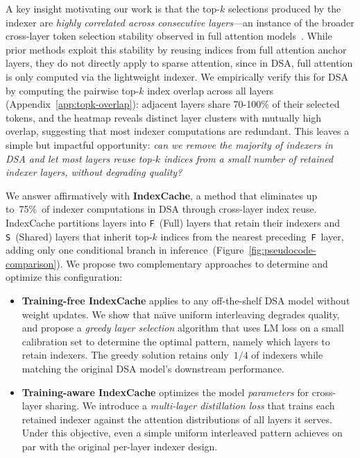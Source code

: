 A key insight motivating our work is that the top-$k$ selections produced by the indexer are \emph{highly correlated across consecutive layers}---an instance of the broader cross-layer token selection stability observed in full attention models~\citep{kascade,hysparse}.
While prior methods exploit this stability by reusing indices from full attention anchor layers, they do not directly apply to sparse attention, since in DSA, full attention is only computed via the lightweight indexer.
We empirically verify this for DSA by computing the pairwise top-$k$ index overlap across all layers (Appendix~\ref{app:topk-overlap}): adjacent layers share 70-100\% of their selected tokens, and the heatmap reveals distinct layer clusters with mutually high overlap, suggesting that most indexer computations are redundant.
This leaves a simple but impactful opportunity: \emph{can we remove the majority of indexers in DSA and let most layers reuse top-$k$ indices from a small number of retained indexer layers, without degrading quality?}

We answer affirmatively with \textbf{IndexCache}, a method that eliminates up to~75\%\ of indexer computations in DSA through cross-layer index reuse.
IndexCache partitions layers into \texttt{F}~(Full) layers that retain their indexers and \texttt{S}~(Shared) layers that inherit top-$k$ indices from the nearest preceding~\texttt{F}~layer, adding only one conditional branch in inference~(Figure~\ref{fig:pseudocode-comparison}).
We propose two complementary approaches to determine and optimize this configuration:

\begin{itemize}[leftmargin=*,itemsep=4pt]
    \item \textbf{Training-free IndexCache} applies to any off-the-shelf DSA model without weight updates.
    We show that na\"{\i}ve uniform interleaving degrades quality, and propose a \emph{greedy layer selection} algorithm that uses LM loss on a small calibration set to determine the optimal pattern, namely which layers to retain indexers.
    The greedy solution retains only~$1/4$ of indexers while matching the original DSA model's downstream performance.

    \item \textbf{Training-aware IndexCache} optimizes the model \emph{parameters} for cross-layer sharing.
    We introduce a \emph{multi-layer distillation loss} that trains each retained indexer against the attention distributions of all layers it serves.
    Under this objective, even a simple uniform interleaved pattern achieves on par with the original per-layer indexer design.
\end{itemize}

